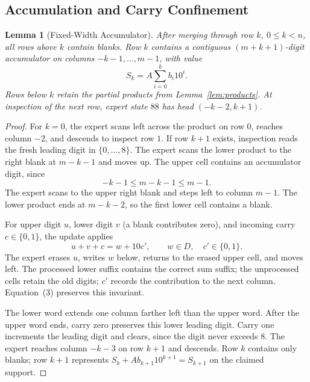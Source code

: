 \documentclass[11pt,a4paper]{article}
\newtheorem{lemma}{Lemma}
\begin{document}
\subsection{Accumulation and Carry Confinement}
\begin{lemma}[Fixed-Width Accumulator]\label{lem:sum}
After merging through row $k$, $0\le k<n$, all rows above $k$ contain blanks.
Row $k$ contains a contiguous $(m+k+1)$-digit accumulator on columns
$-k-1,\ldots,m-1$, with value
\[
S_k=A\sum_{i=0}^{k}b_i10^i.
\]
Rows below $k$ retain the partial products from Lemma~\ref{lem:products}.
At inspection of the next row, expert state $88$ has head $(-k-2,k+1)$.
\end{lemma}
\begin{proof}
For $k=0$, the expert scans left across the product on row $0$, reaches
column $-2$, and descends to inspect row $1$.
If row $k+1$ exists, inspection reads the fresh leading digit in
$\{0,\ldots,8\}$. The expert scans the lower product to the right blank at
$m-k-1$ and moves up. The upper cell contains an accumulator digit, since
\[
-k-1\le m-k-1\le m-1.
\]
The expert scans to the upper right blank and steps left to column $m-1$.
The lower product ends at $m-k-2$, so the first lower cell contains a blank.

For upper digit $u$, lower digit $v$ (a blank contributes zero), and incoming
carry $c\in\{0,1\}$, the update applies
\[
u+v+c=w+10c',\qquad
w\in D,\quad c'\in\{0,1\}. \tag{3}
\]
The expert erases $u$, writes $w$ below, returns to the erased upper cell,
and moves left. The processed lower suffix contains the correct sum suffix;
the unprocessed cells retain the old digits; $c'$ records the contribution
to the next column. Equation~(3) preserves this invariant.

The lower word extends one column farther left than the upper word.
After the upper word ends, carry zero preserves this lower leading digit.
Carry one increments the leading digit and clears, since the digit never
exceeds $8$. The expert reaches column $-k-3$ on row $k+1$ and descends.
Row $k$ contains only blanks; row $k+1$ represents
$S_k+A b_{k+1}10^{k+1}=S_{k+1}$ on the claimed support.
\end{proof}
\end{document}
